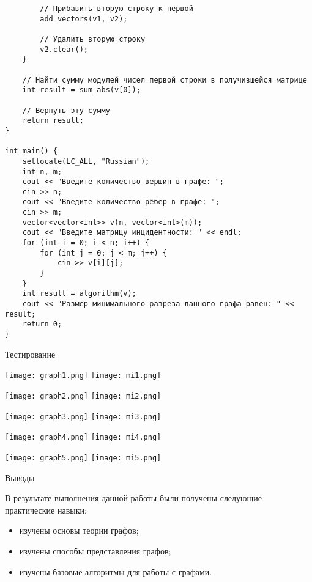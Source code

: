 \documentclass[a4paper,14p]{article}
\begin{document}
\begin{verbatim}
        // Прибавить вторую строку к первой
        add_vectors(v1, v2);

        // Удалить вторую строку
        v2.clear();
    }

    // Найти сумму модулей чисел первой строки в получившейся матрице
    int result = sum_abs(v[0]);

    // Вернуть эту сумму
    return result;
}

int main() {
    setlocale(LC_ALL, "Russian");
    int n, m;
    cout << "Введите количество вершин в графе: ";
    cin >> n;
    cout << "Введите количество рёбер в графе: "; 
    cin >> m;
    vector<vector<int>> v(n, vector<int>(m));
    cout << "Введите матрицу инцидентности: " << endl;
    for (int i = 0; i < n; i++) {
        for (int j = 0; j < m; j++) {
            cin >> v[i][j];
        }
    }
    int result = algorithm(v);
    cout << "Размер минимального разреза данного графа равен: " << result;
    return 0;
}
\end{verbatim}

\vspace{10pt}
\begin{center}
    \large Тестирование
\end{center}

\texttt{[image: graph1.png]}
\texttt{[image: mi1.png]}

\texttt{[image: graph2.png]}
\texttt{[image: mi2.png]}

\texttt{[image: graph3.png]}
\texttt{[image: mi3.png]}

\texttt{[image: graph4.png]}
\texttt{[image: mi4.png]}

\texttt{[image: graph5.png]}
\texttt{[image: mi5.png]}

\vspace{10pt}
\begin{center}
    \large Выводы
\end{center}

В результате выполнения данной работы были получены следующие практические навыки:
\begin{itemize}
    \item изучены основы теории графов;
    \item изучены способы представления графов;
    \item изучены базовые алгоритмы для работы с графами.
\end{itemize}
\end{document}
